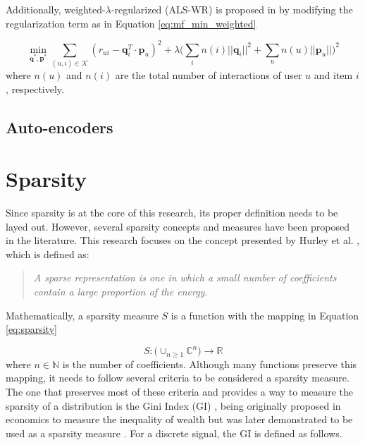     Additionally, weighted-$\lambda$-regularized (ALS-WR) is proposed in \cite{2008ALSWR} by modifying the regularization term as in Equation \ref{eq:mf_min_weighted}
    
    \begin{equation}
        \label{eq:mf_min_weighted}
        \min_{\mathbf{q}^*, \mathbf{p}^*} \sum_{(u,i) \in \mathcal{K}} (r_{ui} - \mathbf{q}^T_i \cdot \mathbf{p}_u)^2 + \lambda \Big(\sum_i n(i)||\mathbf{q}_i||^2 + \sum_u n(u)||\mathbf{p}_u||\Big)^2
    \end{equation} where $n(u)$ and $n(i)$ are the total number of interactions of user $u$ and item $i$, respectively.

\subsection{Auto-encoders}


\section{Sparsity}

    Since sparsity is at the core of this research, its proper definition needs to be layed out. However, several sparsity concepts and measures have been proposed in the literature. This research focuses on the concept presented by Hurley et al. \cite{10.1109/TIT.2009.2027527}, which is defined as: 
    
    \begin{quote}
        \textit{A sparse representation is one in which a small number of coefficients contain a large proportion of the energy}.    
    \end{quote}
     
    Mathematically, a sparsity measure $S$ is a function with the mapping in Equation \ref{eq:sparsity}
     
    \begin{equation}
        \label{eq:sparsity}
        S: \bigg( \cup_{n \geq 1} \mathbb{C}^n \bigg) \rightarrow \mathbb{R}
    \end{equation} where $n \in \mathbb{N}$ is the number of coefficients. Although many functions preserve this mapping, it needs to follow several criteria to be considered a sparsity measure. The one that preserves most of these criteria and provides a way to measure the sparsity of a distribution is the Gini Index (GI)  \cite{10.2307/2223525}, being originally proposed in economics to measure the inequality of wealth but was later demonstrated to be used as a sparsity measure \cite{2006SparseSources, 2004GiniIndexSpeech}. For a discrete signal, the GI is defined as follows.
    
